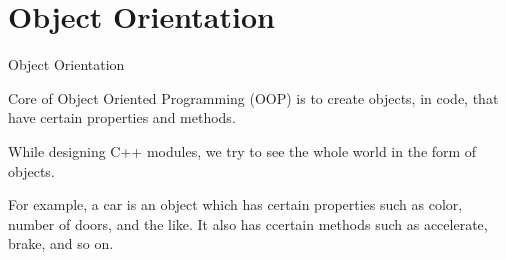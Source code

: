 \documentclass[../lecture5-objectorientation.tex]{subfiles}
\begin{document}
\section{Object Orientation}


\begin{frame}[fragile]{Object Orientation}

    Core of Object Oriented Programming (OOP) is to create objects, in code, that have certain properties and methods. \newline

    While designing C++ modules, we try to see the whole world in the form of objects. \newline

    For example, a car is an object which has certain properties such as color, number of doors, and the like. It also has ccertain methods such as accelerate, brake, and so on.
\end{frame}

\end{document}
